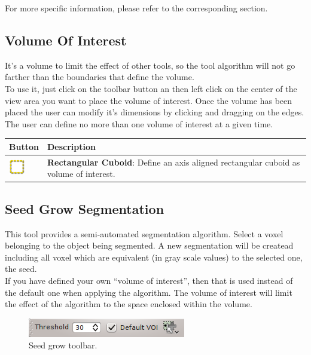 For more specific information, please refer to the corresponding section.

\subsection{Volume Of Interest}

It's a volume to limit the effect of other tools, so the tool algorithm will not
go farther than the boundaries that define the volume.\\
To use it, just click on the toolbar button an then left click on the center of
the view area you want to place the volume of interest. Once the volume has been
placed the user can modify it's dimensions by clicking and dragging on the edges.\\
The user can define no more than one volume of interest at a given time. 

\vspace{0.3cm}
\begin{tabular}{| m{1.3cm} | m{12cm} |}
\hline
\textbf{Button} & \textbf{Description}\\
\hline
\includegraphics[width=0.7cm]{../../frontend/toolbar/voi/rsc/roi} &
\textbf{Rectangular Cuboid}: Define an axis aligned rectangular cuboid as volume
of interest.\\
\hline
\end{tabular}


\subsection{Seed Grow Segmentation}

This tool provides a semi-automated segmentation algorithm. Select a voxel
belonging to the object being segmented. A new segmentation will be createad
including all voxel which are equivalent (in gray scale values) to the selected
one, the seed.\\
If you have defined your own ``volume of interest'', then that is used instead of
the default one when applying the algorithm. The volume of interest will limit the
effect of the algorithm to the space enclosed within the volume.\\

\begin{figure}[H]
\centering
\includegraphics{fig/SeedGrowSegmentation}
\caption{Seed grow toolbar.}
\end{figure}
\vspace{0.3cm}

